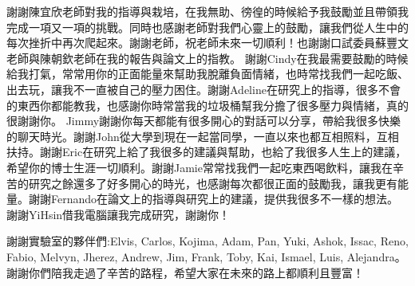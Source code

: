 \par 謝謝陳宜欣老師對我的指導與栽培，在我無助、徬徨的時候給予我鼓勵並且帶領我完成一項又一項的挑戰。同時也感謝老師對我們心靈上的鼓勵，讓我們從人生中的每次挫折中再次爬起來。謝謝老師，祝老師未來一切順利！也謝謝口試委員蘇豐文老師與陳朝欽老師在我的報告與論文上的指教。
謝謝Cindy在我最需要鼓勵的時候給我打氣，常常用你的正面能量來幫助我脫離負面情緒，也時常找我們一起吃飯、出去玩，讓我不一直被自己的壓力困住。謝謝Adeline在研究上的指導，很多不會的東西你都能教我，也感謝你時常當我的垃圾桶幫我分擔了很多壓力與情緒，真的很謝謝你。
Jimmy謝謝你每天都能有很多開心的對話可以分享，帶給我很多快樂的聊天時光。謝謝John從大學到現在一起當同學，一直以來也都互相照料，互相扶持。謝謝Eric在研究上給了我很多的建議與幫助，也給了我很多人生上的建議，希望你的博士生涯一切順利。謝謝Jamie常常找我們一起吃東西喝飲料，讓我在辛苦的研究之餘還多了好多開心的時光，也感謝每次都很正面的鼓勵我，讓我更有能量。謝謝Fernando在論文上的指導與研究上的建議，提供我很多不一樣的想法。謝謝YiHsin借我電腦讓我完成研究，謝謝你！
\par 謝謝實驗室的夥伴們:Elvis, Carlos, Kojima, Adam, Pan, Yuki, Ashok, Issac, Reno, Fabio, Melvyn, Jherez, Andrew, Jim, Frank, Toby, Kai, Ismael, Luis, Alejandra。謝謝你們陪我走過了辛苦的路程，希望大家在未來的路上都順利且豐富！
\clearpage 